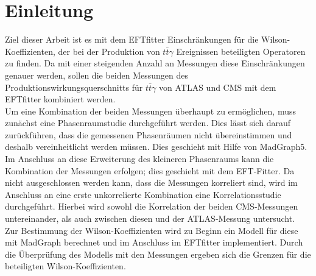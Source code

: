 \chapter{Einleitung}
Ziel dieser Arbeit ist es mit dem EFTfitter\cite{Castro:2016jjv} Einschränkungen für die Wilson-Koeffizienten, der bei der Produktion von $t\bar{t}\gamma$ Ereignissen beteiligten Operatoren zu finden. Da mit einer steigenden Anzahl an Messungen diese Einschränkungen genauer werden, sollen die beiden Messungen des Produktionswirkungsquerschnitts für $t\bar{t}\gamma$ von ATLAS\cite{Aaboud:2017era} und CMS\cite{Sirunyan:2017iyh} mit dem EFTfitter kombiniert werden.\\
Um eine Kombination der beiden Messungen überhaupt zu ermöglichen, muss zunächst eine Phasenraumstudie durchgeführt werden. Dies lässt sich darauf zurückführen, dass die gemessenen Phasenräumen nicht übereinstimmen und deshalb vereinheitlicht werden müssen. Dies geschieht mit Hilfe von MadGraph5\cite{Alwall:2014hca}.\\
Im Anschluss an diese Erweiterung des kleineren Phasenraums kann die Kombination der Messungen erfolgen; dies geschieht mit dem EFT-Fitter. Da nicht ausgeschlossen werden kann, dass die Messungen korreliert sind, wird im Anschluss an eine erste unkorrelierte Kombination eine Korrelationsstudie durchgeführt. Hierbei wird sowohl die Korrelation der beiden CMS-Messungen untereinander, als auch zwischen diesen und der ATLAS-Messung untersucht.\\
Zur Bestimmung der Wilson-Koeffizienten wird zu Beginn ein Modell für diese mit MadGraph berechnet und im Anschluss im EFTfitter implementiert. Durch die Überprüfung des Modells mit den Messungen ergeben sich die Grenzen für die beteiligten Wilson-Koeffizienten.

